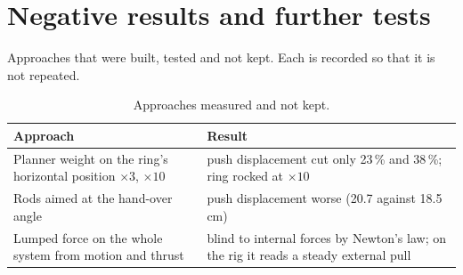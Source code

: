 \section{Negative results and further tests}
\label{sec:app_negatives}

Approaches that were built, tested and not kept. Each is recorded so that it is not repeated.

\begin{table}[H]
\centering
\small
\caption{Approaches measured and not kept.}
\label{tab:app_negatives}
\begin{tabularx}{\textwidth}{XX}
\toprule
Approach & Result \\
\midrule
Planner weight on the ring's horizontal position $\times 3$, $\times 10$ & push displacement cut only 23\,\% and 38\,\%; ring rocked at $\times 10$ \\
Rods aimed at the hand-over angle & push displacement worse (20.7 against 18.5\,cm) \\
Lumped force on the whole system from motion and thrust & blind to internal forces by Newton's law; on the rig it reads a steady external pull \\
\bottomrule
\end{tabularx}
\end{table}

